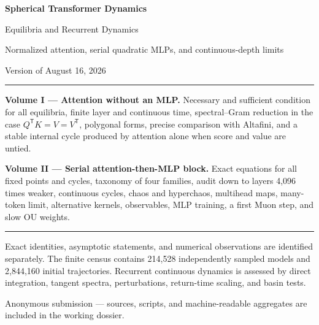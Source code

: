 \documentclass[11pt,a4paper]{article}
\begin{document}
\begin{center}
\vspace*{1.0cm}
{\Huge\bfseries Spherical Transformer Dynamics\par}
\vspace{0.45cm}
{\LARGE Equilibria and Recurrent Dynamics\par}
\vspace{0.3cm}
{\large Normalized attention, serial quadratic MLPs, and continuous-depth limits\par}
\vspace{0.8cm}
{\large Version of August 16, 2026\par}
\end{center}

\vspace{0.55cm}
{\color{deepblue}\hrule}
\vspace{0.55cm}

\textbf{Volume I --- Attention without an MLP.}
Necessary and sufficient condition for all equilibria, finite layer and continuous
time, spectral--Gram reduction in the case
$Q^{\mathsf T}K=V=V^{\mathsf T}$, polygonal forms, precise comparison with Altafini,
and a stable internal cycle produced by attention alone when score and value are untied.

\textbf{Volume II --- Serial attention-then-MLP block.}
Exact equations for all fixed points and cycles, taxonomy of four families, audit down
to layers 4,096 times weaker, continuous cycles, chaos and hyperchaos, multihead maps,
many-token limit, alternative kernels, observables, MLP training, a first Muon step,
and slow OU weights.

\vspace{0.35cm}
{\color{deepblue}\hrule}
\vspace{0.55cm}

Exact identities, asymptotic statements, and numerical observations are identified
separately. The finite census contains 214,528 independently sampled models and
2,844,160 initial trajectories. Recurrent continuous dynamics is assessed by direct
integration, tangent spectra, perturbations, return-time scaling, and basin tests.

\vfill
\begin{center}
{\small Anonymous submission --- sources, scripts, and machine-readable aggregates are
included in the working dossier.}
\end{center}
\end{document}
